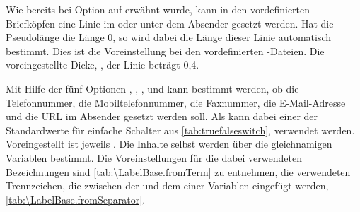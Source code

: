 \begin{Declaration}
\end{Declaration}
Wie bereits bei Option
 auf
 erwähnt wurde, kann in den
vordefinierten Briefköpfen eine Linie im oder unter dem Absender gesetzt
werden. Hat die Pseudolänge  die
Länge 0, so wird dabei die Länge dieser Linie automatisch bestimmt. Dies ist
die Voreinstellung bei den vordefinierten
-Dateien. %
%
Die voreingestellte Dicke,
, der Linie beträgt 0,4.%
\EndIndexGroup


\begin{Declaration}
\end{Declaration}%
Mit Hilfe der fünf Optionen ,
, ,
 und  kann bestimmt werden, ob die
Telefonnummer, die
Mobiltelefonnummer, die Faxnummer,
die E-Mail-Adresse und die URL im Absender gesetzt werden
soll. Als  kann dabei einer der Standardwerte für einfache
Schalter aus \autoref{tab:truefalseswitch}, 
verwendet werden. Voreingestellt ist jeweils
. Die Inhalte selbst werden über die gleichnamigen Variablen
bestimmt. Die Voreinstellungen für die dabei verwendeten Bezeichnungen sind
\autoref{tab:\LabelBase.fromTerm} zu entnehmen, die verwendeten Trennzeichen,
die zwischen der  und dem  einer Variablen
eingefügt werden, \autoref{tab:\LabelBase.fromSeparator}.


